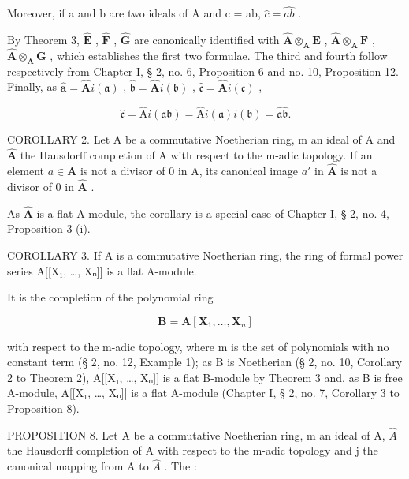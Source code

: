 Moreover, if a and b are two ideals of A and c = ab, \(\hat{c} = \hat{ab}\) .

By Theorem 3, \(\hat{\mathbf{E}}\) , \(\hat{\mathbf{F}}\) , \(\hat{\mathbf{G}}\) are canonically identified with \(\hat{\mathbf{A}} \otimes_{\mathbf{A}} \mathbf{E}\) , \(\hat{\mathbf{A}} \otimes_{\mathbf{A}} \mathbf{F}\) , \(\hat{\mathbf{A}} \otimes_{\mathbf{A}} \mathbf{G}\) , which establishes the first two formulae. The third and fourth follow respectively from Chapter I, § 2, no. 6, Proposition 6 and no. 10, Proposition 12. Finally, as \(\hat{\mathbf{a}} = \hat{\mathbf{A}}i(\mathfrak{a})\) , \(\hat{\mathfrak{b}} = \hat{\mathbf{A}}i(\mathfrak{b})\) , \(\hat{\mathfrak{c}} = \hat{\mathbf{A}}i(\mathfrak{c})\) ,

\[
\hat {\mathfrak {c}} = \hat {\mathrm{A}} i (\mathfrak {a b}) = \hat {\mathrm{A}} i (\mathfrak {a}) i (\mathfrak {b}) = \hat {\mathfrak {a b}}.
\]

COROLLARY 2. Let A be a commutative Noetherian ring, m an ideal of A and \(\hat{\mathbf{A}}\) the Hausdorff completion of A with respect to the m-adic topology. If an element \(a \in \mathbf{A}\) is not a divisor of 0 in A, its canonical image \(a'\) in \(\hat{\mathbf{A}}\) is not a divisor of 0 in \(\hat{\mathbf{A}}\) .

As \(\hat{\mathbf{A}}\) is a flat A-module, the corollary is a special case of Chapter I, § 2, no. 4, Proposition 3 (i).

COROLLARY 3. If A is a commutative Noetherian ring, the ring of formal power series A{[}{[}X₁, \ldots, Xₙ{]}{]} is a flat A-module.

It is the completion of the polynomial ring

\[
\mathbf {B} = \mathbf {A} [ \mathbf {X} _ {1}, \dots , \mathbf {X} _ {n} ]
\]

with respect to the m-adic topology, where m is the set of polynomials with no constant term (§ 2, no. 12, Example 1); as B is Noetherian (§ 2, no. 10, Corollary 2 to Theorem 2), A{[}{[}X₁, \ldots, Xₙ{]}{]} is a flat B-module by Theorem 3 and, as B is free A-module, A{[}{[}X₁, \ldots, Xₙ{]}{]} is a flat A-module (Chapter I, § 2, no. 7, Corollary 3 to Proposition 8).

PROPOSITION 8. Let A be a commutative Noetherian ring, m an ideal of A, \(\hat{A}\) the Hausdorff completion of A with respect to the m-adic topology and j the canonical mapping from A to \(\hat{A}\) . The :

